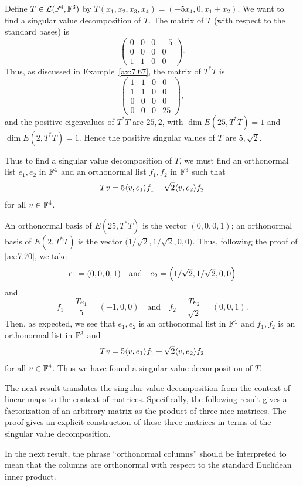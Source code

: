 \begin{example}\label{ax:7.79}
Define $T\in\mathcal{L}(\mathbb{F}^4,\mathbb{F}^3)$ by $T(x_1,x_2,x_3,x_4)=(-5x_4,0,x_1+x_2)$. We want
to find a singular value decomposition of $T$. The matrix of $T$ (with respect
to the standard bases) is
\[ \begin{pmatrix} 0&0&0&-5\\ 0&0&0&0\\ 1&1&0&0 \end{pmatrix}. \]
Thus, as discussed in Example~\ref{ax:7.67}, the matrix of $T^*T$ is
\[ \begin{pmatrix} 1&1&0&0\\ 1&1&0&0\\ 0&0&0&0\\ 0&0&0&25 \end{pmatrix}, \]
and the positive eigenvalues of $T^*T$ are $25,2$, with
$\dim E(25,T^*T)=\allowbreak1$ and $\dim E(2,T^*T)=1$. Hence the positive singular values of $T$ are
$5,\sqrt2$.

Thus to find a singular value decomposition of $T$, we must find an
orthonormal list $e_1,e_2$ in $\mathbb{F}^4$ and an orthonormal list $f_1,f_2$ in
$\mathbb{F}^3$ such that
\[ Tv = 5\langle v, e_1 \rangle f_1+\sqrt2\langle v, e_2 \rangle f_2 \]
for all $v\in\mathbb{F}^4$.

An orthonormal basis of $E(25,T^*T)$ is the vector $(0,0,0,1)$; an orthonormal
basis of $E(2,T^*T)$ is the vector
$\bigl(1/\sqrt2,1/\sqrt2,0,0\bigr)$. Thus, following the proof
of \ref{ax:7.70}, we take
\[ e_1=(0,0,0,1) \quad\text{and}\quad
   e_2=\Bigl(1/\sqrt2,1/\sqrt2,0,0\Bigr) \]
and
\[ f_1=\frac{Te_1}{5}=(-1,0,0) \quad\text{and}\quad
   f_2=\frac{Te_2}{\sqrt2}=(0,0,1). \]
Then, as expected, we see that $e_1,e_2$ is an orthonormal list in $\mathbb{F}^4$ and
$f_1,f_2$ is an orthonormal list in $\mathbb{F}^3$ and
\[ Tv = 5\langle v, e_1 \rangle f_1+\sqrt2\langle v, e_2 \rangle f_2 \]
for all $v\in\mathbb{F}^4$. Thus we have found a singular value decomposition of $T$.
\end{example}

The next result translates the singular value decomposition from the context
of linear maps to the context of matrices. Specifically, the following result
gives a factorization of an arbitrary matrix as the product of three nice
matrices. The proof gives an explicit construction of these three matrices in
terms of the singular value decomposition.

In the next result, the phrase ``orthonormal columns'' should be interpreted to
mean that the columns are orthonormal with respect to the standard Euclidean
inner product.

